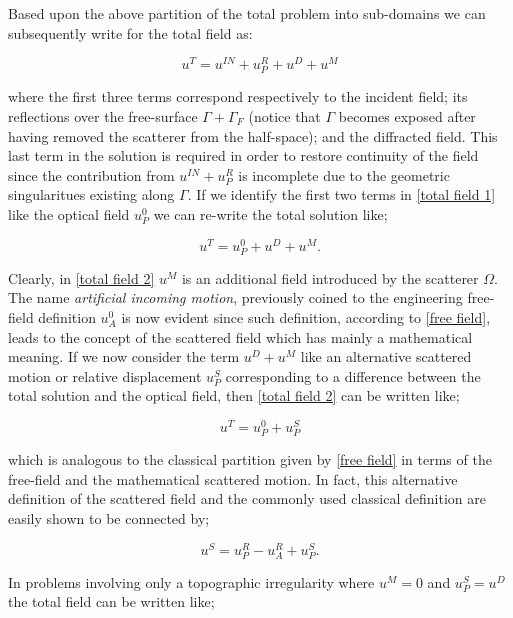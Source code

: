 \documentclass[11pt,letterpaper]{article}
\begin{document}
Based upon the above partition of the total problem into sub-domains we can subsequently write for the total field as:

\begin{equation}
\label{total field 1}
{u^T}={u^{IN}}+{u^R_P}+{u^D}+{u^M}
\end{equation}

where the first three terms correspond respectively to the incident field; its reflections over the free-surface $\Gamma + \Gamma_F$ (notice that $\Gamma$ becomes exposed after having removed the scatterer from the half-space); and the diffracted field. This last term in the solution is required in order to restore continuity of the field since the contribution from ${u^{IN}}+{u^R_P}$ is incomplete due to the geometric singularitues existing along $\Gamma$. If we identify the first two terms in \cref{total field 1} like the optical field $u^0_P$ we can re-write the total solution like;

\begin{equation}
\label{total field 2}
{u^T}={u^0_P}+{u^D}+{u^M}.
\end{equation}

Clearly, in \cref{total field 2} $u^M$ is an additional field introduced by the scatterer $\Omega$. The name {\it artificial incoming motion}, previously coined to the engineering free-field definition $u^0_A$ is now evident since such definition, according to \cref{free field}, leads to the concept of the scattered field which has mainly a mathematical meaning. If we now consider the term ${u^D}+{u^M}$ like an alternative scattered motion or relative displacement $u^S_P$ corresponding to a difference between the total solution and the optical field, then \cref{total field 2} can be written like;

\begin{equation}
\label{P free field}
{u^T}={u^0_P}+{u^S_P}
\end{equation}

which is analogous to the classical partition given by \cref{free field} in terms of the free-field and the mathematical scattered motion. In fact, this alternative definition of the scattered field and the commonly used classical definition are easily shown to be connected by;

\begin{equation}
\label{diffraction to scattered}
{u^S}={u^R_P}-{u^R_A}+{u^S_P}.
\end{equation}

In problems involving only a topographic irregularity where $u^M=0$ and ${u^S_P}={u^D}$ the total field can be written like;
\end{document}
